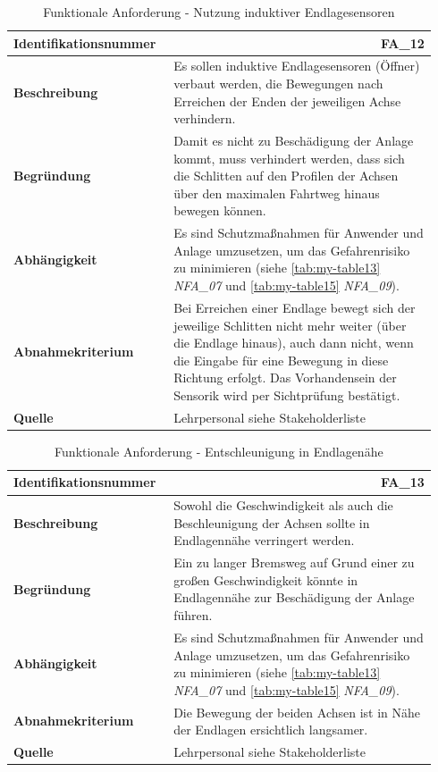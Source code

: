 \documentclass[../../../Bachelorarbeit.tex]{subfiles}
\begin{document}
\begin{table}[H]
    \centering
    \begin{tabular}{ p{0.34\linewidth}  p{0.6\linewidth} } 
        \hline
        \textbf{Identifikationsnummer}  & \multicolumn{1}{r}{FA\_12} \\ \hline
        \textbf{Beschreibung}           & Es sollen induktive Endlagesensoren (Öffner) verbaut werden, die Bewegungen nach Erreichen der Enden der jeweiligen Achse verhindern. \\
        \textbf{Begründung}             & Damit es nicht zu Beschädigung der Anlage kommt, muss verhindert werden, dass sich die Schlitten auf den Profilen der Achsen über den maximalen Fahrtweg hinaus bewegen können. \\
        \textbf{Abhängigkeit}           & Es sind Schutzmaßnahmen für Anwender und Anlage umzusetzen, um das Gefahrenrisiko zu minimieren (siehe \autoref{tab:my-table13} \textit{NFA\_07} und \autoref{tab:my-table15} \textit{NFA\_09}). \\
        \textbf{Abnahmekriterium}       & Bei Erreichen einer Endlage bewegt sich der jeweilige Schlitten nicht mehr weiter (über die Endlage hinaus), auch dann nicht, wenn die Eingabe für eine Bewegung in diese Richtung erfolgt. Das Vorhandensein der Sensorik wird per Sichtprüfung bestätigt. \\
        \textbf{Quelle}                 & Lehrpersonal siehe Stakeholderliste \\ \hline
    \end{tabular}
    \caption[\acs{fa} - Nutzung induktiver Endlagesensoren]{Funktionale Anforderung - Nutzung induktiver Endlagesensoren}
    \label{tab:my-table5}
\end{table}
\begin{table}[H]
    \centering
    \begin{tabular}{ p{0.34\linewidth}  p{0.6\linewidth} } 
        \hline
        \textbf{Identifikationsnummer}  & \multicolumn{1}{r}{FA\_13} \\ \hline
        \textbf{Beschreibung}           & Sowohl die Geschwindigkeit als auch die Beschleunigung der Achsen sollte in Endlagennähe verringert werden. \\
        \textbf{Begründung}             & Ein zu langer Bremsweg auf Grund einer zu großen Geschwindigkeit könnte in Endlagennähe zur Beschädigung der Anlage führen. \\
        \textbf{Abhängigkeit}           & Es sind Schutzmaßnahmen für Anwender und Anlage umzusetzen, um das Gefahrenrisiko zu minimieren (siehe \autoref{tab:my-table13} \textit{NFA\_07} und \autoref{tab:my-table15} \textit{NFA\_09}). \\
        \textbf{Abnahmekriterium}       & Die Bewegung der beiden Achsen ist in Nähe der Endlagen ersichtlich langsamer. \\
        \textbf{Quelle}                 & Lehrpersonal siehe Stakeholderliste \\ \hline
    \end{tabular}
    \caption[\acs{fa} - Entschleunigung in Endlagenähe]{Funktionale Anforderung - Entschleunigung in Endlagenähe}
    \label{tab:my-table6}
\end{table}
\end{document}
